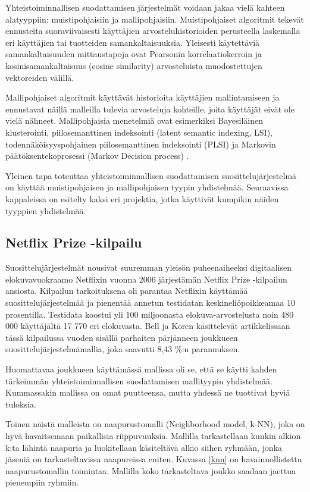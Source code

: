 \documentclass[12pt,finnish]{tktltiki2}
\theoremstyle{definition}
\theoremstyle{remark}
\begin{document}
         Yhteistoiminnallisen suodattamisen järjestelmät voidaan jakaa vielä kahteen alatyyppiin: muistipohjaisiin ja mallipohjaisiin. Muistipohjaiset algoritmit tekevät ennusteita suoraviivaisesti käyttäjien arvosteluhistorioiden perusteella laskemalla eri käyttäjien tai tuotteiden samankaltaisuuksia. Yleisesti käytettäviä samankaltaisuuden mittaustapoja ovat Pearsonin korrelaatiokerroin ja kosinisamankaltaisuus (cosine similarity) arvosteluista muodostettujen vektoreiden välillä.
         
Mallipohjaiset algoritmit käyttävät historioita käyttäjien mallintamiseen ja ennustavat näillä malleilla tulevia arvosteluja kohteille, joita käyttäjät eivät ole vielä nähneet. Mallipohjaisia menetelmiä ovat esimerkiksi Bayesiläinen klusterointi, piilosemanttinen indeksointi (latent semantic indexing, LSI), todennäköisyyspohjainen piilosemanttinen indeksointi (PLSI) ja Markovin päätöksentekoprosessi (Markov Decision process) \cite{Das:2007:GNP:1242572.1242610}.
        
Yleinen tapa toteuttaa yhteistoiminnallisen suodattamisen suosittelujärjestelmä on käyttää muistipohjaisen ja mallipohjaisen tyypin yhdistelmää. Seuraavissa kappaleissa on esitelty kaksi eri projektia, jotka käyttivät kumpikin näiden tyyppien yhdistelmää.

\subsection{Netflix Prize -kilpailu}

        Suosittelujärjestelmät nousivat suuremman yleisön puheenaiheeksi digitaalisen elokuvavuokraamo Netflixin vuonna 2006 järjestämän Netflix Prize -kilpailun ansiosta. Kilpailun tarkoituksena oli parantaa Netflixin käyttämää suosittelujärjestelmää ja pienentää annetun testidatan keskineliöpoikkeamaa 10 prosentilla. Testidata koostui yli 100 miljoonasta elokuva-arvostelusta noin 480 000 käyttäjältä 17 770 eri elokuvasta. Bell ja Koren käsittelevät artikkelissaan \cite{Bell:2007:LNP:1345448.1345465} tässä kilpailussa vuoden sisällä parhaiten pärjänneen joukkueen suosittelujärjestelmämallia, joka saavutti 8,43 \%:n parannuksen.
        
        Huomattavaa joukkueen käyttämässä mallissa oli se, että se käytti kahden tärkeimmän yhteistoiminnallisen suodattamisen mallityypin yhdistelmää. Kummassakin mallissa on omat puutteensa, mutta yhdessä ne tuottivat hyviä tuloksia.
        
        Toinen näistä malleista on naapurustomalli (Neighborhood model, k-NN), joka on hyvä havaitsemaan paikallisia riippuvuuksia. Mallilla tarkastellaan kunkin alkion k:ta lähintä naapuria ja luokitellaan käsiteltävä alkio siihen ryhmään, jonka jäseniä on tarkasteltavissa naapureissa eniten. Kuvassa \ref{knn} on havainnollistettu naapurustomallin toimintaa. Mallilla koko tarkasteltava joukko saadaan jaettua pienempiin ryhmiin.
        
\end{document}
